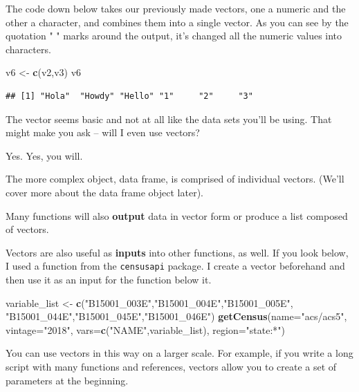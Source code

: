 \documentclass[
]{book}
\newenvironment{Shaded}{\begin{snugshade}}{\end{snugshade}}
\newcommand{\DataTypeTok}[1]{\textcolor[rgb]{0.13,0.29,0.53}{#1}}
\newcommand{\KeywordTok}[1]{\textcolor[rgb]{0.13,0.29,0.53}{\textbf{#1}}}
\newcommand{\NormalTok}[1]{#1}
\newcommand{\StringTok}[1]{\textcolor[rgb]{0.31,0.60,0.02}{#1}}
\begin{document}
The code down below takes our previously made vectors, one a numeric and the other a character, and combines them into a single vector. As you can see by the quotation " " marks around the output, it's changed all the numeric values into characters.

\begin{Shaded}
\begin{Highlighting}[]
\NormalTok{v6 <-}\StringTok{ }\KeywordTok{c}\NormalTok{(v2,v3)}
\NormalTok{v6}
\end{Highlighting}
\end{Shaded}

\begin{verbatim}
## [1] "Hola"  "Howdy" "Hello" "1"     "2"     "3"
\end{verbatim}

The vector seems basic and not at all like the data sets you'll be using. That might make you ask -- will I even use vectors?

Yes. Yes, you will.

The more complex object, data frame, is comprised of individual vectors. (We'll cover more about the data frame object later).

Many functions will also \textbf{output} data in vector form or produce a list composed of vectors.

Vectors are also useful as \textbf{inputs} into other functions, as well. If you look below, I used a function from the \texttt{censusapi} package. I create a vector beforehand and then use it as an input for the function below it.

\begin{Shaded}
\begin{Highlighting}[]
\NormalTok{variable_list <-}\StringTok{ }
\StringTok{    }\KeywordTok{c}\NormalTok{(}\StringTok{"B15001_003E"}\NormalTok{,}\StringTok{"B15001_004E"}\NormalTok{,}\StringTok{"B15001_005E"}\NormalTok{,}
      \StringTok{"B15001_044E"}\NormalTok{,}\StringTok{"B15001_045E"}\NormalTok{,}\StringTok{"B15001_046E"}\NormalTok{)}
\KeywordTok{getCensus}\NormalTok{(}\DataTypeTok{name=}\StringTok{"acs/acs5"}\NormalTok{,}
          \DataTypeTok{vintage=}\StringTok{"2018"}\NormalTok{,}
          \DataTypeTok{vars=}\KeywordTok{c}\NormalTok{(}\StringTok{"NAME"}\NormalTok{,variable_list),}
          \DataTypeTok{region=}\StringTok{"state:*"}\NormalTok{)}
\end{Highlighting}
\end{Shaded}

You can use vectors in this way on a larger scale. For example, if you write a long script with many functions and references, vectors allow you to create a set of parameters at the beginning.
\end{document}

